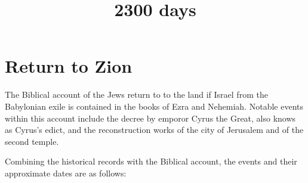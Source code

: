 \documentclass[]{book}
\begin{document}
\title{2300 days}

\maketitle




\section{Return to Zion}
The Biblical account of the Jews return to to the land if Israel from the Babylonian exile is contained
in the books of Ezra and Nehemiah. Notable events within this account include the decree by emporor Cyrus the Great, also knows as Cyrus's edict, and the
reconstruction works of the city of Jerusalem and of the second temple.

Combining the historical records with the Biblical account, the events and their approximate dates are as follows:
\end{document}

